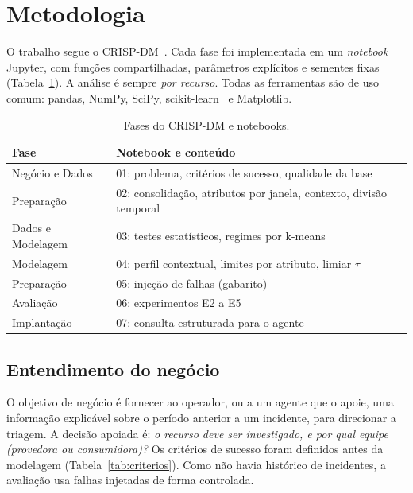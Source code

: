 \documentclass[sigconf,nonacm]{acmart}
\begin{document}
\section{Metodologia}\label{sec:metodologia}

O trabalho segue o CRISP-DM~\citep{wirth2000crispdm,chapman2000crispdm}. Cada fase foi implementada em um \emph{notebook} Jupyter, com funções compartilhadas, parâmetros explícitos e sementes fixas (Tabela~\ref{tab:fases}). A análise é sempre \emph{por recurso}. Todas as ferramentas são de uso comum: pandas, NumPy, SciPy, scikit-learn~\citep{pedregosa2011sklearn} e Matplotlib.

\begin{table}[t]
  \caption{Fases do CRISP-DM e notebooks.}
  \label{tab:fases}
  \small
  \begin{tabular}{p{}p{}}
    \toprule
    Fase & Notebook e conteúdo \\
    \midrule
    Negócio e Dados & 01: problema, critérios de sucesso, qualidade da base \\
    Preparação & 02: consolidação, atributos por janela, contexto, divisão temporal \\
    Dados e Modelagem & 03: testes estatísticos, regimes por k-means \\
    Modelagem & 04: perfil contextual, limites por atributo, limiar $\tau$ \\
    Preparação & 05: injeção de falhas (gabarito) \\
    Avaliação & 06: experimentos E2 a E5 \\
    Implantação & 07: consulta estruturada para o agente \\
    \bottomrule
  \end{tabular}
\end{table}

\subsection{Entendimento do negócio}
O objetivo de negócio é fornecer ao operador, ou a um agente que o apoie, uma informação explicável sobre o período anterior a um incidente, para direcionar a triagem. A decisão apoiada é: \emph{o recurso deve ser investigado, e por qual equipe (provedora ou consumidora)?} Os critérios de sucesso foram definidos antes da modelagem (Tabela~\ref{tab:criterios}). Como não havia histórico de incidentes, a avaliação usa falhas injetadas de forma controlada.
\end{document}
